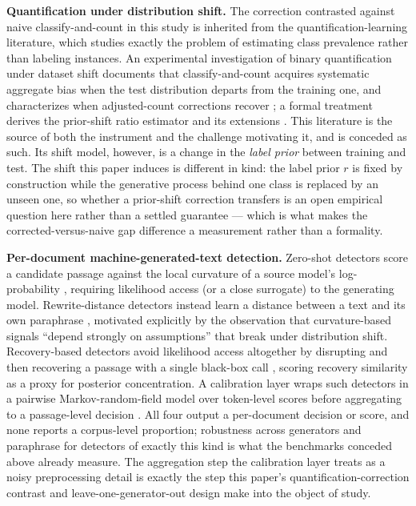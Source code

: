 \documentclass[11pt]{article}
\begin{document}
\textbf{Quantification under distribution shift.} The correction contrasted against naive classify-and-count in this study is inherited from the quantification-learning literature, which studies exactly the problem of estimating class prevalence rather than labeling instances. An experimental investigation of binary quantification under dataset shift documents that classify-and-count acquires systematic aggregate bias when the test distribution departs from the training one, and characterizes when adjusted-count corrections recover \citep{QuantDatasetShift2023}; a formal treatment derives the prior-shift ratio estimator and its extensions \citep{QuantPriorShift2018}. This literature is the source of both the instrument and the challenge motivating it, and is conceded as such. Its shift model, however, is a change in the \emph{label prior} between training and test. The shift this paper induces is different in kind: the label prior $r$ is fixed by construction while the generative process behind one class is replaced by an unseen one, so whether a prior-shift correction transfers is an open empirical question here rather than a settled guarantee --- which is what makes the corrected-versus-naive gap difference a measurement rather than a formality.

\textbf{Per-document machine-generated-text detection.} Zero-shot detectors score a candidate passage against the local curvature of a source model's log-probability \citep{DetectGPT2023}, requiring likelihood access (or a close surrogate) to the generating model. Rewrite-distance detectors instead learn a distance between a text and its own paraphrase \citep{LearnToDistance2023}, motivated explicitly by the observation that curvature-based signals ``depend strongly on assumptions'' that break under distribution shift. Recovery-based detectors avoid likelihood access altogether by disrupting and then recovering a passage with a single black-box call \citep{DR2023RecoveryDetect}, scoring recovery similarity as a proxy for posterior concentration. A calibration layer wraps such detectors in a pairwise Markov-random-field model over token-level scores before aggregating to a passage-level decision \citep{MarkovCalibration2023}. All four output a per-document decision or score, and none reports a corpus-level proportion; robustness across generators and paraphrase for detectors of exactly this kind is what the benchmarks conceded above \citep{RAID2024Benchmark,MAGE2024InTheWild} already measure. The aggregation step the calibration layer treats as a noisy preprocessing detail is exactly the step this paper's quantification-correction contrast and leave-one-generator-out design make into the object of study.
\end{document}

